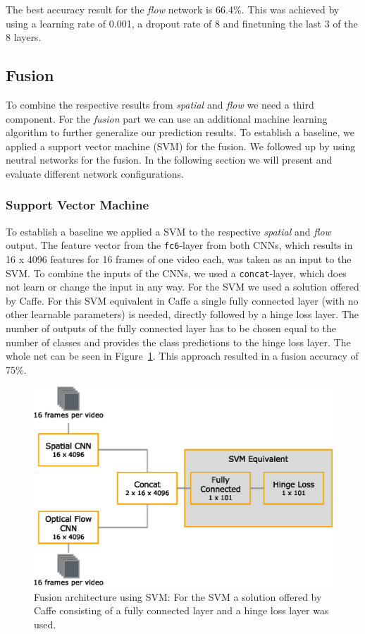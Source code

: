 The best accuracy result for the \emph{flow} network is 66.4\%.
This was achieved by using a learning rate of 0.001, a dropout rate of 8 and finetuning the last 3 of the 8 layers.

\subsection{Fusion}
\label{subsec:fusion}

To combine the respective results from \emph{spatial} and \emph{flow} we need a third component.
For the \emph{fusion} part we can use an additional machine learning algorithm to further generalize our prediction results.
To establish a baseline, we applied a support vector machine (SVM) for the fusion.
We followed up by using neutral networks for the fusion.
In the following section we will present and evaluate different network configurations.

\subsubsection{Support Vector Machine}
To establish a baseline we applied a SVM to the respective \emph{spatial} and \emph{flow} output.
The feature vector from the \texttt{fc6}-layer from both CNNs, which results in 16 x 4096 features for 16 frames of one video each, was taken as an input to the SVM.
To combine the inputs of the CNNs, we used a \texttt{concat}-layer, which does not learn or change the input in any way.
For the SVM we used a solution offered by Caffe.
For this SVM equivalent in Caffe a single fully connected layer (with no other learnable parameters) is needed, directly followed by a hinge loss layer.
The number of outputs of the fully connected layer has to be chosen equal to the number of classes and provides the class predictions to the hinge loss layer.
The whole net can be seen in Figure~\ref{fig:svm_fusion}.
This approach resulted in a fusion accuracy of 75\%.

\begin{figure}[tb]
	\centering
	\includegraphics[scale=.7]{images/fusion_svm.eps}
	\caption{Fusion architecture using SVM: For the SVM a solution offered by Caffe consisting of a fully connected layer and a hinge loss layer was used.}
	\label{fig:svm_fusion}
\end{figure}

